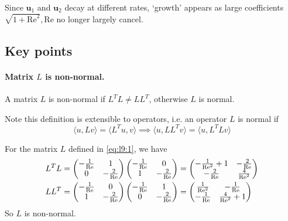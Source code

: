 \documentclass{jknotes}
\renewcommand{\u}{\symbf{u}}
\newcommand{\ReN}{\text{Re}}
\begin{document}
Since $\u_1$ and $\u_2$ decay at different rates, `growth' appears as large
coefficients $\sqrt{1+\ReN^2}, \ReN$ no longer largely cancel.

\subsection{Key points}
\paragraph{Matrix $L$ is non-normal.}
\begin{defn}
	A matrix $L$ is non-normal if $L^T L \ne L L^T$, otherwise $L$ is normal.
\end{defn}
Note this definition is extensible to operators, i.e. an operator $L$ is
normal if 
\begin{equation}
	\langle u, Lv \rangle = \langle L^T u, v \rangle \implies \langle u, L L^T
	v \rangle = \langle u, L^T L v\rangle
\end{equation}

For the matrix $L$ defined in \eqref{eq:l9:1}, we have
\begin{align}
	L^T L = 
	\begin{pmatrix}
		-\inv{\ReN} & 1 \\ 0 & -\frac{2}{\ReN} 
	\end{pmatrix}
	\begin{pmatrix}
		-\frac{1}{\ReN} & 0 \\ 1 & -\frac{2}{\ReN} 
	\end{pmatrix}
	&= \begin{pmatrix}
		-\frac{1}{\ReN^2} + 1 & -\frac{2}{\ReN} \\ -\frac{2}{\ReN} &
		\frac{4}{\ReN^2}
	\end{pmatrix} \\
	L L^T = 
	\begin{pmatrix}
		-\inv{\ReN} & 0 \\ 1 & -\frac{2}{\ReN} 
	\end{pmatrix}
	\begin{pmatrix}
		-\frac{1}{\ReN} & 1 \\ 0 & -\frac{2}{\ReN} 
	\end{pmatrix}
	&= \begin{pmatrix}
		\frac{1}{\ReN^2} & -\frac{1}{\ReN} \\ -\frac{1}{\ReN} &
		\frac{4}{\ReN^2} + 1
	\end{pmatrix}
\end{align}
So $L$ is non-normal.
\end{document}
